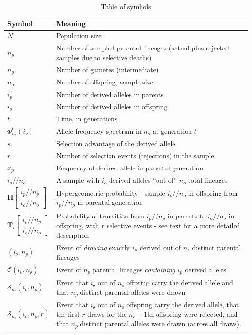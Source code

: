 \documentclass[review,nonatbib]{elsarticle}
\newcommand{\dslash}{/\!\!/}
\newcommand{\Coalc}[4]{\begin{bmatrix}#1\dslash #2 \\ #3\dslash #4 \end{bmatrix}}
\newcommand{\ms}{\mathcal{S}}
\begin{document}
\begin{table}
  \centering
  \begin{tabular}{l|p{100mm}}
    Symbol & Meaning\\
    \hline
    $N$ & Population size\\
    $n_p$ & Number of sampled parental lineages (actual plus rejected samples due to selective deaths)\\
    $n_g$ & Number of gametes (intermediate)\\
    $n_o$ & Number of offspring, sample size\\
    $i_p$ & Number of derived alleles in parents\\
    $i_o$ & Number of derived alleles in offspring\\
    $t$ & Time, in generations\\
    $\Phi_{n_o}^{t}(i_o)$ & Allele frequency spectrum in $n_o$ at generation $t$\\
    $s$ & Selection advantage of the derived allele\\
    $r$ & Number of selection events (rejections) in the sample\\
    $x_p$ & Frequency of derived allele in parental generation\\
    $i_o \dslash n_o$ & A sample with $i_o$ derived alleles ``out of'' $n_o$ total lineages\\
    $\mathbf{H}\Coalc{i_p}{n_p}{i_o}{n_o}$ & Hypergeometric probability -
                                             sample $i_o \dslash n_o$ in offspring from $i_p \dslash n_p$ in parental generation\\
    $\mathbf{T}_{r}\Coalc{i_p}{n_p}{i_o}{n_o}$ & Probability of transition from $i_p \dslash n_p$ in parents
                                                 to $i_o \dslash n_o$ in offspring, with $r$ selective events -
                                                 see text for a more detailed description\\
    \hline
    $(i_p, n_p)$ & Event of \textit{drawing} exactly $i_p$ derived out of $n_p$ distinct parental lineages \\
    $\mathcal{C}(i_p, n_p)$ & Event of $n_p$ parental lineages \textit{containing} $i_p$ derived alleles \\
    $\mathcal{S}_{n_o}(i_o, n_p)$ & Event that  $i_o$ out of $n_o$ offpring carry the derived allele and that $n_p$ distinct parental alleles were drawn \\
    $\ms_{n_o}(i_o, n_p, r)$ & Event that  $i_o$ out of $n_o$ offspring carry the derived allele, that the first $r$ draws for the 
    $n_o+1$th offspring were rejected, 
    and that $n_p$ distinct parental alleles were drawn (across all draws).
  \end{tabular}
  \caption{\label{tab_symbols} Table of symbols}
\end{table}
\end{document}
